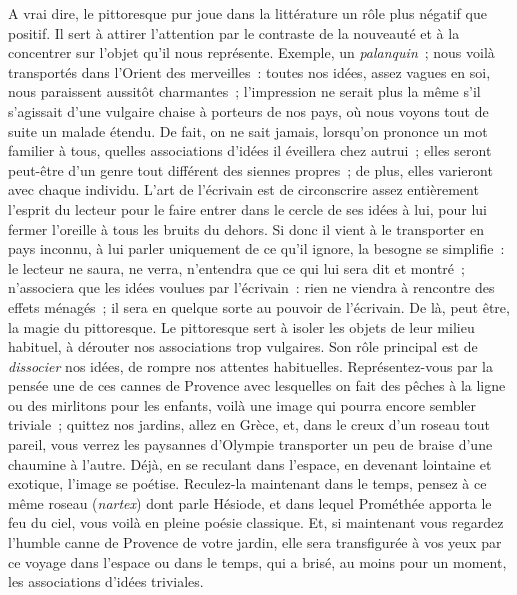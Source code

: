 \documentclass[french,twoside]{book} %
\begin{document}
A vrai dire, le pittoresque pur joue dans la littérature un rôle plus négatif que positif. Il sert à attirer l’attention par le contraste de la nouveauté et à la concentrer sur l’objet qu’il nous représente. Exemple, un \emph{palanquin} ; nous voilà transportés dans l’Orient des merveilles : toutes nos idées, assez vagues en soi, nous paraissent aussitôt charmantes ; l’impression ne serait plus la même s’il s’agissait d’une vulgaire chaise à porteurs de nos pays, où nous voyons tout de suite un malade étendu. De fait, on ne sait jamais, lorsqu’on prononce un mot familier à tous, quelles associations d’idées il éveillera chez autrui ; elles seront peut-être d’un genre tout différent des siennes propres ; de plus, elles varieront avec chaque individu. L’art de l’écrivain est de circonscrire assez entièrement l’esprit du lecteur pour le faire entrer dans le cercle de ses idées à lui, pour lui fermer l’oreille à tous les bruits du dehors. Si donc il vient à le transporter en pays inconnu, à lui parler uniquement de ce qu’il ignore, la besogne se simplifie : le lecteur ne saura, ne verra, n’entendra que ce qui lui sera dit et montré ; n’associera que les idées voulues par l’écrivain : rien ne viendra à rencontre des effets ménagés ; il sera en quelque sorte au pouvoir de l’écrivain. De là, peut être, la magie du pittoresque. Le pittoresque sert à isoler les objets de leur milieu habituel, à dérouter nos associations trop vulgaires. Son rôle principal est de \emph{dissocier} nos idées, de rompre nos attentes habituelles. Représentez-vous par la pensée une de ces cannes de Provence avec lesquelles on fait des pêches à la ligne ou des mirlitons pour les enfants, voilà une image qui pourra encore sembler triviale ; quittez nos jardins, allez en Grèce, et, dans le creux d’un roseau tout pareil, vous verrez les paysannes d’Olympie transporter un peu de braise d’une chaumine à l’autre. Déjà, en se reculant dans l’espace, en devenant lointaine et exotique, l’image se poétise. Reculez-la maintenant dans le temps, pensez à ce même roseau (\emph{nartex}) dont parle Hésiode, et dans lequel Prométhée apporta le feu du ciel, vous voilà en pleine poésie classique. Et, si maintenant vous regardez l’humble canne de Provence de votre jardin, elle sera transfigurée à vos yeux par ce voyage dans l’espace ou dans le temps, qui a brisé, au moins pour un moment, les associations d’idées triviales.\par
\end{document}

